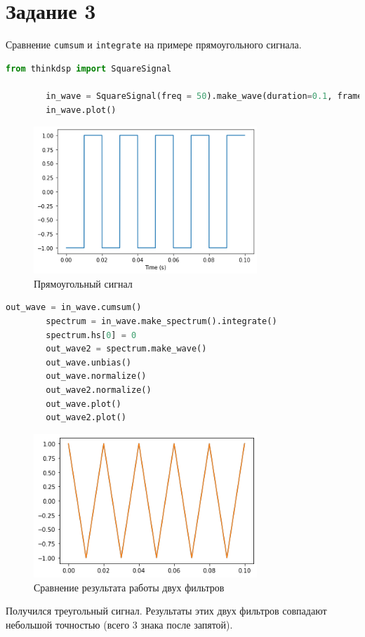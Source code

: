 \documentclass[a4paper, 12pt]{report}
\begin{document}
	\section{Задание 3}
	Сравнение \texttt{cumsum} и \texttt{integrate} на примере прямоугольного сигнала.
	\begin{lstlisting}[language=Python,caption=Прямоугольный сигнал]
		from thinkdsp import SquareSignal

		in_wave = SquareSignal(freq = 50).make_wave(duration=0.1, framerate=44100)
		in_wave.plot()
	\end{lstlisting}
	\begin{figure}[H]
		\centering
		\includegraphics[width=0.75\textwidth]{task5.png}
		\caption{Прямоугольный сигнал}
		\label{fig:task5}
	\end{figure}
	\begin{lstlisting}[language=Python,caption=Сравнение двух фильтров]
		out_wave = in_wave.cumsum()
		spectrum = in_wave.make_spectrum().integrate()
		spectrum.hs[0] = 0
		out_wave2 = spectrum.make_wave()
		out_wave.unbias()
		out_wave.normalize()
		out_wave2.normalize()
		out_wave.plot()
		out_wave2.plot()
	\end{lstlisting}
	\begin{figure}[H]
		\centering
		\includegraphics[width=0.75\textwidth]{task6.png}
		\caption{Сравнение результата работы двух фильтров}
		\label{fig:task6}
	\end{figure}
	Получился треугольный сигнал. Результаты этих двух фильтров совпадают небольшой точностью (всего 3 знака после запятой).
\end{document}
